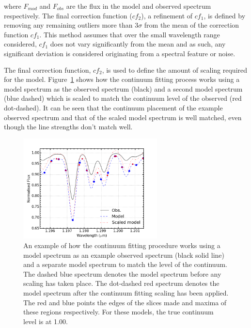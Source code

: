 \noindent where $F_{mod}$ and $F_{obs}$ are the flux in the model and observed spectrum respectively.
The final correction function ($cf_{2}$), a refinement of $cf_{1}$,
is defined by removing any remaining outliers more than 3$\sigma$ from the mean of the correction function $cf_{1}$.
This method assumes that over the small wavelength range considered,
$cf_{1}$ does not vary significantly from the mean and as such, any significant deviation is considered originating from a spectral feature or noise.

The final correction function, $cf_{2}$,
is used to define the amount of scaling required for the model.
Figure~\ref{fig:cftaction} shows how the continuum fitting process works using a model spectrum as the observed spectrum (black) and a second model spectrum
(blue dashed) which is scaled to match the continuum level of the observed
(red dot-dashed).
It can be seen that the continuum placement of the example observed spectrum and that of the scaled model spectrum is well matched, even though the line strengths don't match well.

\begin{figure}
 \centering
\includegraphics[width=0.65\textwidth]{JAnal/cftaction}
\caption[Example of continuum fitting]{
An example of how the continuum fitting procedure works using a model spectrum as
an example observed spectrum (black solid line)
and a separate model spectrum to match the level of the continuum.
The dashed blue spectrum denotes the model spectrum before any scaling has taken place.
The dot-dashed red spectrum denotes the model spectrum after the continuum fitting scaling has been applied.
The red and blue points the edges of the slices made and maxima of these regions respectively.
For these models, the true continuum level is at 1.00.\label{fig:cftaction}
         }
\end{figure}



